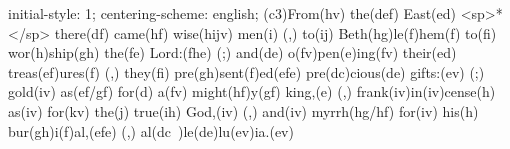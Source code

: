 initial-style: 1;
centering-scheme: english;
(c3)From(hv) the(def) East(ed) <sp>*</sp> there(df) came(hf) wise(hijv) men(i) (,) to(ij) Beth(hg)le(f)hem(f) to(fi) wor(h)ship(gh) the(fe) Lord:(fhe) (;) and(de) o(fv)pen(e)ing(fv) their(ed) treas(ef)ures(f) (,) they(fi) pre(gh)sent(f)ed(efe) pre(dc)cious(de) gifts:(ev) (;) gold(iv) as(ef/gf) for(d) a(fv) might(hf)y(gf) king,(e) (,) frank(iv)in(iv)cense(h) as(iv) for(kv) the(j) true(ih) God,(iv) (,) and(iv) myrrh(hg/hf) for(iv) his(h) bur(gh)i(f)al,(efe) (,) al(dc~)le(de)lu(ev)ia.(ev)
